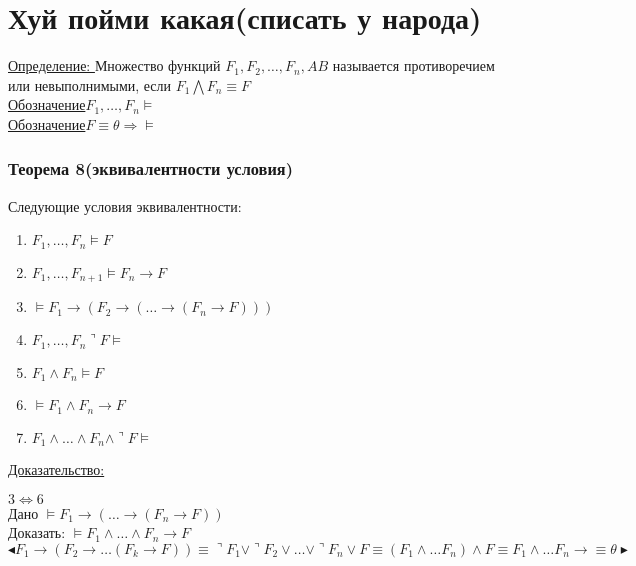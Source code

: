 \documentclass[12pt]{article}
\begin{document}
    \section{Хуй пойми какая(списать у народа)}
    \underline{Определение: } Множество функций $F_1,F_2,\dots,F_n,AB$ называется противоречием или невыполнимыми, если $F_1 \bigwedge F_n \equiv F$\\
    \underline{Обозначение}$F_1,\dots,F_n \models $\\
    \underline{Обозначение}$F \equiv \theta \Rightarrow \models$\\
    \subsubsection*{Теорема 8(эквивалентности условия)}\label{th:2.8}
    Следующие условия эквивалентности:\par\noindent
    \begin{enumerate}
        \item $F_1,\dots,F_n \models F$
        \item $F_1,\dots,F_{n+1} \models F_n \rightarrow F$
        \item $\models F_1 \rightarrow(F_2 \rightarrow(\dots \rightarrow (F_n \rightarrow F)))$
        \item $F_1,\dots,F_n \urcorner F \models$
        \item $F_1 \wedge F_n \models F$
        \item $\models F_1 \wedge F_n \rightarrow F$
        \item $F_1 \wedge \dots \wedge F_n \wedge \urcorner F \models$
    \end{enumerate}    
    \underline{Доказательство:}
    \begin{adjustwidth}{1.5em}{1.5em}
        $3 \Longleftrightarrow  6$\\
        Дано $\models F_1 \rightarrow(\dots \rightarrow(F_n \rightarrow F))$\\
        Доказать: $\models F_1 \wedge \dots \wedge F_n \rightarrow F$\\
        \[\blacktriangleleft F_1 \rightarrow(F_2 \rightarrow \dots(F_k \rightarrow F)) \equiv \urcorner F_1
        \vee \urcorner F_2 \vee \dots \vee \urcorner F_n \vee F \equiv (F_1 \wedge \dots F_n) \wedge F \equiv
        F_1 \wedge \dots F_n \rightarrow \equiv \theta \blacktriangleright\]
    \end{adjustwidth}
\end{document}
